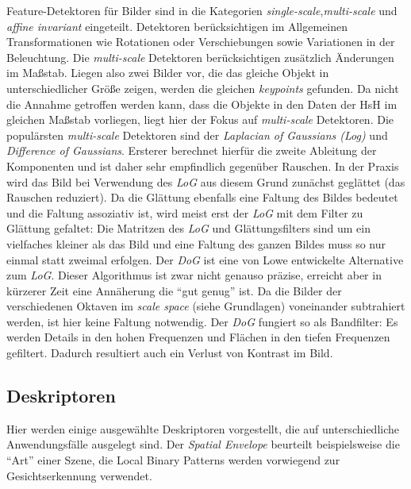 Feature-Detektoren für Bilder sind in die Kategorien \textit{single-scale},\textit{multi-scale} und \textit{affine invariant} eingeteilt. Detektoren berücksichtigen im Allgemeinen Transformationen wie Rotationen oder Verschiebungen sowie Variationen in der Beleuchtung. Die \textit{multi-scale} Detektoren berücksichtigen zusätzlich Änderungen im Maßstab. Liegen also zwei Bilder vor, die das gleiche Objekt in unterschiedlicher Größe zeigen, werden die gleichen \textit{keypoints} gefunden. Da nicht die Annahme getroffen werden kann, dass die Objekte in den Daten der HsH im gleichen Maßstab vorliegen, liegt hier der Fokus auf \textit{multi-scale} Detektoren.\newline
Die populärsten \textit{multi-scale} Detektoren sind der \textit{Laplacian of Gaussians (Log)} und \textit{Difference of Gaussians}. Ersterer berechnet hierfür die zweite Ableitung der Komponenten und ist daher sehr empfindlich gegenüber Rauschen. In der Praxis wird das Bild bei Verwendung des \textit{LoG} aus diesem Grund zunächst geglättet (das Rauschen reduziert). Da die Glättung ebenfalls eine Faltung des Bildes bedeutet und die Faltung assoziativ ist, wird meist erst der \textit{LoG} mit dem Filter zu Glättung gefaltet: Die Matritzen des \textit{LoG} und Glättungsfilters sind um ein vielfaches kleiner als das Bild und eine Faltung des ganzen Bildes muss so nur einmal statt zweimal erfolgen. Der \textit{DoG} ist eine von Lowe entwickelte Alternative zum \textit{LoG}. Dieser Algorithmus ist zwar nicht genauso präzise, erreicht aber in kürzerer Zeit eine Annäherung die \enquote{gut genug} ist. Da die Bilder der verschiedenen Oktaven im \textit{scale space} (siehe Grundlagen) voneinander subtrahiert werden, ist hier keine Faltung notwendig. Der \textit{DoG} fungiert so als Bandfilter: Es werden Details in den hohen Frequenzen und Flächen in den tiefen Frequenzen gefiltert. Dadurch resultiert auch ein Verlust von Kontrast im Bild.

\subsection{Deskriptoren}

Hier werden einige ausgewählte Deskriptoren vorgestellt, die auf unterschiedliche Anwendungsfälle ausgelegt sind. Der \textit{Spatial Envelope} beurteilt beispielsweise die \enquote{Art} einer Szene, die Local Binary Patterns werden vorwiegend zur Gesichtserkennung verwendet. \newline

